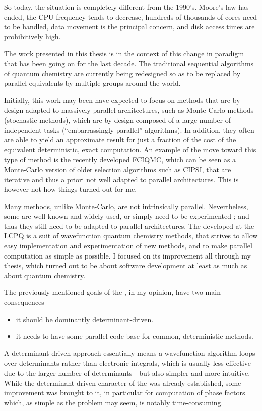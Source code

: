 \documentclass[12pt,a4paper]{report}
\begin{document}
So today, the situation is completely different from the 1990's.
Moore's law has ended\cite{Khan2018Jan}, the CPU frequency tends to decrease,
hundreds of thousands of cores need to be handled, data movement is the
principal concern, and disk access times are prohibitively high.

The work presented in this thesis is in the context of this change in paradigm
that has been going on for the last decade.\cite{Sutter_2005} 
The traditional sequential algorithms of quantum chemistry are currently being
redesigned so as to be replaced by parallel equivalents by multiple groups
around the world. 

Initially, this work may been have expected to focus on methods that are by
design adapted to massively parallel architectures, such as Monte-Carlo methods
(stochastic methods), which are by design composed of a large number of
independent tasks (``embarrassingly parallel'' algorithms). In addition, they
often are able to yield an approximate result for just a fraction of the cost
of the equivalent deterministic, exact computation. An example of the move
toward this type of method is the recently developed FCIQMC, which can be seen
as a Monte-Carlo version of older selection algorithms such as CIPSI, that are
iterative and thus a priori not well adapted to parallel architectures. This is
however not how things turned out for me.

Many methods, unlike Monte-Carlo, are not intrinsically parallel.
Nevertheless, some are well-known and widely used, or simply need to be
experimented ; and thus they still need to be adapted to parallel
architectures. The \QP developed at the LCPQ is a suit of wavefunction quantum
chemistry methods, that strives to allow easy implementation and
experimentation of new methods, and to make parallel computation as simple as
possible. I focused on its improvement all through my thesis, which turned out
to be about software development at least as much as about quantum chemistry.

The previously mentioned goals of the \QP, in my opinion, have two main consequences
\begin{itemize}
\item
it should be dominantly determinant-driven.
\item
it needs to have some parallel code base for common, deterministic methods.
\end{itemize}


A determinant-driven approach essentially means a wavefunction algorithm loops over determinants rather than electronic integrals, which is usually less effective - due to the larger number of determinants - but also simpler and more intuitive. While the determinant-driven character of the \QP was already established, some improvement was brought to it, in particular for computation of phase factors which, as simple as the problem may seem, is notably time-consuming.
\end{document}
